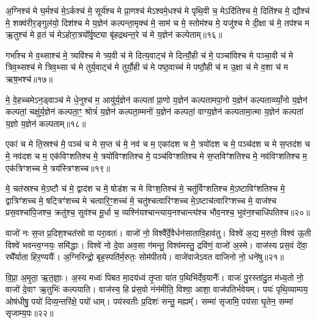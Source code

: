 {\anuvakamend[{गृ॒हाश्च॒ षोड॑श च॥८॥}]}

अ॒ग्निश्च॑ मे घ॒र्मश्च॑ मे॒\-ऽर्कश्च॑ मे॒ सूर्य॑श्च मे प्रा॒णश्च॑ मे\-ऽश्वमे॒धश्च॑ मे पृथि॒वी च॒ मे\-ऽदि॑तिश्च मे॒ दिति॑श्च मे॒ द्यौश्च॑ मे॒ शक्व॑रीर॒ङ्गुल॑यो॒ दिश॑श्च मे य॒ज्ञेन॑ कल्पन्ता॒मृक्च॑ मे॒ साम॑ च मे॒ स्तोम॑श्च मे॒ यजु॑श्च मे दी॒क्षा च॑ मे॒ तप॑श्च म ऋ॒तुश्च॑ मे व्र॒तं च॑ मे\-ऽहोरा॒त्रयो᳚र्वृ॒ष्ट्या बृ॑हद्रथन्त॒रे च॑ मे य॒ज्ञेन॑ कल्पेताम्॥१६॥

{\anuvakamend[{दी॒क्षा\-ऽष्टाद॑श च॥९॥}]}

गर्भा᳚श्च मे व॒थ्साश्च॑ मे॒ त्र्यवि॑श्च मे त्र्य॒वी च॑ मे दित्य॒वाट्च॑ मे दित्यौ॒ही च॑ मे॒ पञ्चा॑विश्च मे पञ्चा॒वी च॑ मे त्रिव॒थ्सश्च॑ मे त्रिव॒थ्सा च॑ मे तुर्य॒वाट्च॑ मे तुर्यौ॒ही च॑ मे पष्ठ॒वाच्च॑ मे पष्ठौ॒ही च॑ म उ॒क्षा च॑ मे व॒शा च॑ म ऋष॒भश्च॑॥१७॥

मे॒ वे॒हच्चमे\-ऽन॒ड्वाञ्च॑ मे धे॒नुश्च॑ म॒ आयु॑र्य॒ज्ञेन॑ कल्पतां प्रा॒णो य॒ज्ञेन॑ कल्पतामपा॒नो य॒ज्ञेन॑ कल्पताव्व्याँ॒नो य॒ज्ञेन॑ कल्पतां॒ चक्षु॑र्य॒ज्ञेन॑ कल्पता॒ꣳ॒ श्रोत्रं॑ य॒ज्ञेन॑ कल्पता॒म्मनो॑ य॒ज्ञेन॑ कल्पतां॒ वाग्य॒ज्ञेन॑ कल्पतामा॒त्मा य॒ज्ञेन॑ कल्पतां य॒ज्ञो य॒ज्ञेन॑ कल्पताम्॥१८॥

{\anuvakamend[{ऋ॒ष॒भश्च॑ चत्वारि॒ꣳ॒शच्च॑॥10॥}]}

एका॑ च मे ति॒स्रश्च॑ मे॒ पञ्च॑ च मे स॒प्त च॑ मे॒ नव॑ च म॒ एका॑दश च मे॒ त्रयो॑दश च मे॒ पञ्च॑दश च मे स॒प्तद॑श च मे॒ नव॑दश च म॒ एक॑विꣳशतिश्च मे॒ त्रयो॑विꣳशतिश्च मे॒ पञ्च॑विꣳशतिश्च मे स॒प्तविꣳ॑शतिश्च मे॒ नव॑विꣳशतिश्च म॒ एक॑त्रिꣳशच्च मे॒ त्रय॑स्त्रिꣳशच्च॥१९॥

मे॒ चत॑स्रश्च मे॒\-ऽष्टौ च॑ मे॒ द्वाद॑श च मे॒ षोड॑श च मे विꣳश॒तिश्च॑ मे॒ चतु॑र्विꣳशतिश्च मे॒\-ऽष्टाविꣳ॑शतिश्च मे॒ द्वात्रिꣳ॑शच्च मे॒ षट्त्रिꣳ॑शच्च मे चत्वारि॒ꣳ॒शच्च॑ मे॒ चतु॑श्चत्वारिꣳशच्च मे॒\-ऽष्टाच॑त्वारिꣳशच्च मे॒ वाज॑श्च प्रस॒वश्चा॑पि॒जश्च॒ क्रतु॑श्च॒ सुव॑श्च मू॒र्धा च॒ व्यश्नि॑यश्चान्त्याय॒नश्चान्त्य॑श्च भौव॒नश्च॒ भुव॑न॒श्चाधि॑पतिश्च॥२०॥

{\anuvakamend[{त्रय॑स्त्रिꣳशच्च॒ व्यश्ञि॑य॒ एका॑दश च॥11॥}]}

वाजो॑ नः स॒प्त प्र॒दिश॒श्चत॑स्रो वा परा॒वतः॑। वाजो॑ नो॒ विश्वै᳚र्दे॒वैर्धन॑सातावि॒हाव॑तु। विश्वे॑ अ॒द्य म॒रुतो॒ विश्व॑ ऊ॒ती विश्वे॑ भवन्त्व॒ग्नयः॒ समि॑द्धाः। विश्वे॑ नो दे॒वा अव॒सा ग॑मन्तु॒ विश्व॑मस्तु॒ द्रवि॑णं॒ वाजो॑ अ॒स्मे। वाज॑स्य प्रस॒वं दे॑वा॒ रथै᳚र्याता हिर॒ण्ययैः᳚। अ॒ग्निरिन्द्रो॒ बृह॒स्पति॑र्म॒रुतः॒ सोम॑पीतये। वाजे॑वाजे\-ऽवत वाजिनो नो॒ धने॑षु॥२१॥

वि॒प्रा॒ अ॒मृ॒ता॒ ऋ॒त॒ज्ञाः॒। अ॒स्य मध्वः॑ पिबत मा॒दय॑ध्वं तृ॒प्ता या॑त प॒थिभि॑र्देव॒यानैः᳚। वाजः॑ पु॒रस्ता॑दु॒त म॑ध्य॒तो नो॒ वाजो॑ दे॒वाꣳ ऋ॒तुभिः॑ कल्पयाति। वाज॑स्य॒ हि प्र॑स॒वो नंन॑मीति॒ विश्वा॒ आशा॒ वाज॑पतिर्भवेयम्। पयः॑ पृथि॒व्याम्पय॒ ओष॑धीषु॒ पयो॑ दिव्य॒न्तरि॑क्षे॒ पयो॑ धाम्। पय॑स्वतीः प्र॒दिशः॑ सन्तु॒ मह्यम्᳚। सम्मा॑ सृजामि॒ पय॑सा घृ॒तेन॒ सम्मा॑ सृजाम्य॒पः॥२२॥

